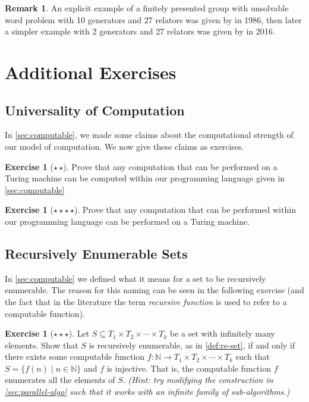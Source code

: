 \documentclass[11pt,a4paper,reqno]{amsart}
\theoremstyle{plain}
\theoremstyle{definition}
\theoremstyle{definition}
\newtheorem{exercise}[theorem]{Exercise}
\newtheorem{remark}[theorem]{Remark}
\newcommand\exerciseLevelMedium{$\star${\,}$\star$}
\newcommand\exerciseLevelHard{$\star${\,}$\star${\,}$\star$}
\newcommand\exerciseLevelVeryHard{$\star${\,}$\star${\,}$\star${\,}$\star$}
\begin{document}
\begin{remark}
	An explicit example of a finitely presented group with unsolvable word problem with 10 generators and 27 relators was given by \textcite{collins1986} in 1986, then later a simpler example with 2 generators and 27 relators was given by \textcite{wang2016} in 2016.
\end{remark}

\printbibliography

\bigskip

\makeatletter\enddoc@text\let\enddoc@text\relax\makeatother

\clearpage
\appendix
\section{Additional Exercises}

\subsection{Universality of Computation}
In \cref{sec:computable}, we made some claims about the computational strength of our model of computation.
We now give these claims as exercises.

\begin{exercise}[\exerciseLevelMedium]
  Prove that any computation that can be performed on a Turing machine can be computed within our programming language given in \cref{sec:computable}
\end{exercise}

\begin{exercise}[\exerciseLevelVeryHard]
  Prove that any computation that can be performed within our programming language can be performed on a Turing machine.
\end{exercise}

\subsection{Recursively Enumerable Sets}\label{sec:apx/re}
In \cref{sec:computable} we defined what it means for a set to be recursively enumerable.
The reason for this naming can be seen in the following exercise (and the fact that in the literature the term \emph{recursive function} is used to refer to a computable function).

\begin{exercise}[\exerciseLevelHard]
	Let $S\subseteq T_1\times T_2\times \cdots \times T_k$ be a set with infinitely many elements.
	Show that $S$ is recursively enumerable, as in \cref{def:re-set}, if and only if there exists some computable function $f\colon \mathbb N \to T_1\times T_2\times \cdots \times T_k$ such that
	$
		S
		=
		\{
		f(n)
		\mid
		n\in \mathbb N
		\}
	$
	and $f$ is injective.
	That is, the computable function $f$ enumerates all the elements of $S$.
	\textit{(Hint: try modifying the construction in \cref{sec:parallel-algo} such that it works with an infinite family of sub-algorithms.)}
\end{exercise}
\end{document}
